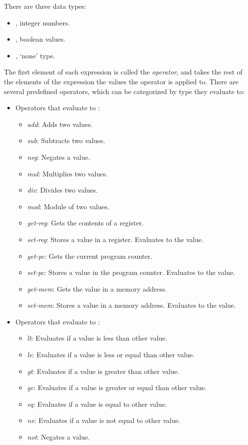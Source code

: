 \noindent
There are three data types:
\begin{itemize}
  \item {}, integer numbers.
  \item {}, boolean values.
  \item {}, `none' type.
\end{itemize}

The first element of each expression is called the \textit{operator}, and takes the rest of the elements of the expression the values the operator is applied to. There are several predefined operators, which can be categorized by type they evaluate to:
\begin{itemize}
  \item Operators that evaluate to :
  \begin{itemize}
    \item \textit{add}: Adds two values.
    \item \textit{sub}: Subtracts two values.
    \item \textit{neg}: Negates a value.
    \item \textit{mul}: Multiplies two values.
    \item \textit{div}: Divides two values.
    \item \textit{mod}: Module of two values.
    \item \textit{get-reg}: Gets the contents of a register.
    \item \textit{set-reg}: Stores a value in a register. Evaluates to the value.
    \item \textit{get-pc}: Gets the current \gls{program counter}.
    \item \textit{set-pc}: Stores a value in the \gls{program counter}. Evaluates to the value.
    \item \textit{get-mem}: Gets the value in a memory address.
    \item \textit{set-mem}: Stores a value in a memory address. Evaluates to the value.
  \end{itemize}
  \item Operators that evaluate to :
  \begin{itemize}
    \item \textit{lt}: Evaluates if a value is less than other value.
    \item \textit{le}: Evaluates if a value is less or equal than other value.
    \item \textit{gt}: Evaluates if a value is greater than other value.
    \item \textit{ge}: Evaluates if a value is greater or equal than other value.
    \item \textit{eq}: Evaluates if a value is equal to other value.
    \item \textit{ne}: Evaluates if a value is not equal to other value.
    \item \textit{not}: Negates a value.
  \end{itemize}
\end{itemize}

